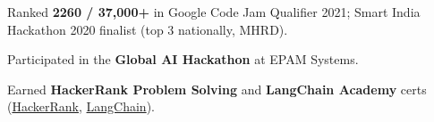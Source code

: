 \begin{zitemize}
    \item Ranked \textbf{2260 / 37,000+} in Google Code Jam Qualifier 2021; Smart India Hackathon 2020 finalist (top 3 nationally, MHRD).
    \item Participated in the \textbf{Global AI Hackathon} at EPAM Systems.
    \item Earned \textbf{HackerRank Problem Solving} and \textbf{LangChain Academy} certs (\href{https://www.hackerrank.com/certificates/7e492a2e11be}{HackerRank}, \href{https://academy.langchain.com/certificates/vkkkoij3ke}{LangChain}).
\end{zitemize}
